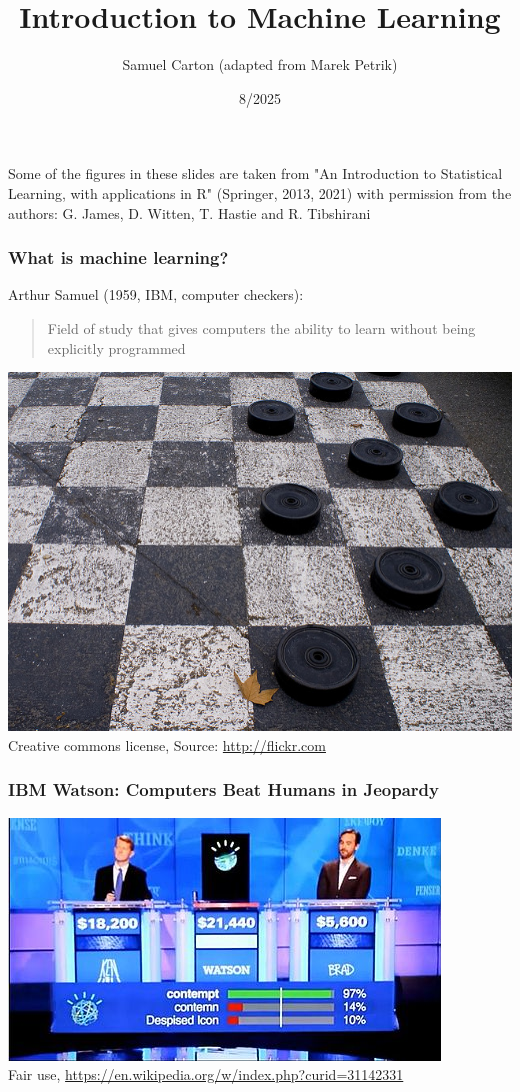 \documentclass{beamer}
\title{Introduction to Machine Learning}
\author{Samuel Carton (adapted from Marek Petrik)}
\date{8/2025}
\begin{document}
	\begin{frame}
		\maketitle
		\tiny{Some of the figures in these slides are taken from "An Introduction to Statistical Learning, with applications in R"  (Springer, 2013, 2021) with permission from the authors: G. James, D. Witten,  T. Hastie and R. Tibshirani }

\end{frame}

\begin{frame} \frametitle{What is machine learning?}
    Arthur Samuel (1959, IBM, computer checkers):
    \begin{quote}
Field of study that gives computers the ability to learn without being explicitly programmed
    \end{quote}

    \begin{center}
        \includegraphics[width=0.6\linewidth]{../figs/class1/checkers.jpg}\\
        {\tiny Creative commons license, Source: \url{http://flickr.com}}
    \end{center}
\end{frame}

\begin{frame} \frametitle{IBM Watson: Computers Beat Humans in Jeopardy}
    \centering
    \includegraphics[width=0.8\linewidth]{../figs/class1/Watson_Jeopardy.jpg} \\
    \tiny{Fair use, \url{https://en.wikipedia.org/w/index.php?curid=31142331}}
\end{frame}
\end{document}
